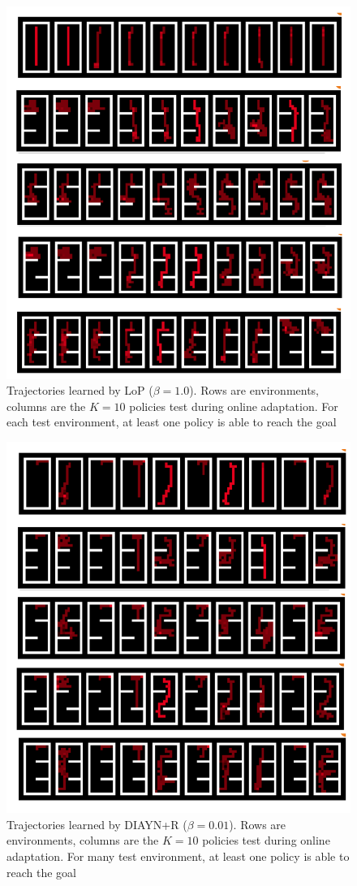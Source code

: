 \begin{figure}[h!]
    \centering
    \includegraphics[width=0.75\linewidth]{images/LOP1.png}
    \caption{Trajectories learned by LoP ($\beta=1.0$). Rows are environments, columns are the $K=10$ policies test during online adaptation. For each test environment, at least one policy is able to reach the goal}
    \label{fig:maze2}
\end{figure}

\begin{figure}[h!]
    \centering
    \includegraphics[width=0.75\linewidth]{images/DIAYN0.01.png}
    \caption{Trajectories learned by DIAYN+R ($\beta=0.01$). Rows are environments, columns are the $K=10$ policies test during online adaptation. For many test environment, at least one policy is able to reach the goal}
    \label{fig:maze3}
\end{figure}

